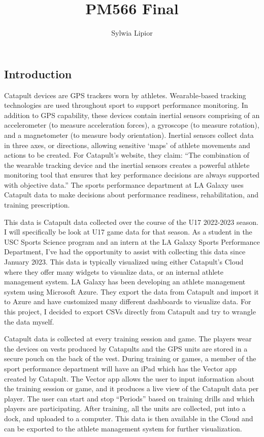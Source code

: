 \documentclass[
  letterpaper,
  DIV=11,
  numbers=noendperiod]{scrartcl}
\title{PM566 Final}
\author{Sylwia Lipior}
\date{}
\begin{document}
\maketitle
\ifdefined\Shaded\renewenvironment{Shaded}{\begin{tcolorbox}[breakable, borderline west={3pt}{0pt}{shadecolor}, frame hidden, interior hidden, boxrule=0pt, sharp corners, enhanced]}{\end{tcolorbox}}\fi

\hypertarget{introduction}{%
\subsection{Introduction}\label{introduction}}

Catapult devices are GPS trackers worn by athletes. Wearable-based
tracking technologies are used throughout sport to support performance
monitoring. In addition to GPS capability, these devices contain
inertial sensors comprising of an accelerometer (to measure acceleration
forces), a gyroscope (to measure rotation), and a magnetometer (to
measure body orientation). Inertial sensors collect data in three axes,
or directions, allowing sensitive `maps' of athlete movements and
actions to be created. For Catapult's website, they claim: ``The
combination of the wearable tracking device and the inertial sensors
creates a powerful athlete monitoring tool that ensures that key
performance decisions are always supported with objective data.'' The
sports performance department at LA Galaxy uses Catapult data to make
decisions about performance readiness, rehabilitation, and training
prescription.

This data is Catapult data collected over the course of the U17
2022-2023 season. I will specifically be look at U17 game data for that
season. As a student in the USC Sports Science program and an intern at
the LA Galaxy Sports Performance Department, I've had the opportunity to
assist with collecting this data since January 2023. This data is
typically visualized using either Catapult's Cloud where they offer many
widgets to visualize data, or an internal athlete management system. LA
Galaxy has been developing an athlete management system using Microsoft
Azure. They export the data from Catapult and import it to Azure and
have customized many different dashboards to visualize data. For this
project, I decided to export CSVs directly from Catapult and try to
wrangle the data myself.

Catapult data is collected at every training session and game. The
players wear the devices on vests produced by Catapults and the GPS
units are stored in a secure pouch on the back of the vest. During
training or games, a member of the sport performance department will
have an iPad which has the Vector app created by Catapult. The Vector
app allows the user to input information about the training session or
game, and it produces a live view of the Catapult data per player. The
user can start and stop ``Periods'' based on training drills and which
players are participating. After training, all the units are collected,
put into a dock, and uploaded to a computer. This data is then available
in the Cloud and can be exported to the athlete management system for
further visualization.
\end{document}
